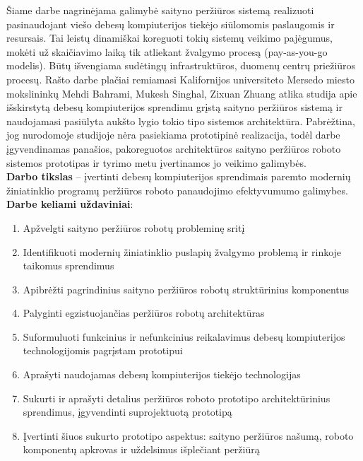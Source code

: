    Šiame darbe nagrinėjama galimybė saityno peržiūros sistemą realizuoti pasinaudojant viešo debesų kompiuterijos tiekėjo siūlomomis paslaugomis ir resursais. Tai leistų dinamiškai koreguoti tokių sistemų veikimo pajėgumus, mokėti už skaičiavimo laiką tik atliekant žvalgymo procesą (pay-as-you-go modelis). Būtų išvengiama sudėtingų infrastruktūros, duomenų centrų priežiūros procesų. Rašto darbe plačiai remiamasi Kalifornijos universiteto Mersedo miesto mokslininkų Mehdi Bahrami, Mukesh Singhal, Zixuan Zhuang atlika studija \cite{MercedCloudBasedWebCrawler} apie išskirstytą debesų kompiuterijos sprendimu grįstą saityno peržiūros sistemą ir naudojamasi pasiūlyta aukšto lygio tokio tipo sistemos architektūra. Pabrėžtina, jog nurodomoje studijoje nėra pasiekiama prototipinė realizacija, todėl darbe įgyvendinamas panašios, pakoreguotos architektūros saityno peržiūros roboto sistemos prototipas ir tyrimo metu įvertinamos jo veikimo galimybės.
\\

\textbf{Darbo tikslas} -- įvertinti debesų kompiuterijos sprendimais paremto modernių žiniatinklio programų peržiūros roboto panaudojimo efektyvumumo galimybes. 
\\

\textbf{Darbe keliami uždaviniai}:

\begin{enumerate}
    \item Apžvelgti saityno peržiūros robotų probleminę sritį
    \item Identifikuoti modernių žiniatinklio puslapių žvalgymo problemą ir rinkoje taikomus sprendimus
    \item Apibrėžti pagrindinius saityno peržiūros robotų struktūrinius komponentus
    \item Palyginti egzistuojančias peržiūros robotų architektūras
    \item Suformuluoti funkcinius ir nefunkcinius reikalavimus debesų kompiuterijos technologijomis pagrįstam prototipui
    \item Aprašyti naudojamas debesų kompiuterijos tiekėjo technologijas
    \item Sukurti ir aprašyti detalius peržiūros roboto prototipo architektūrinius sprendimus, įgyvendinti suprojektuotą prototipą
    \item Įvertinti šiuos sukurto prototipo aspektus: saityno peržiūros našumą, roboto komponentų apkrovas ir uždelsimus išplečiant peržiūrą
\end{enumerate}